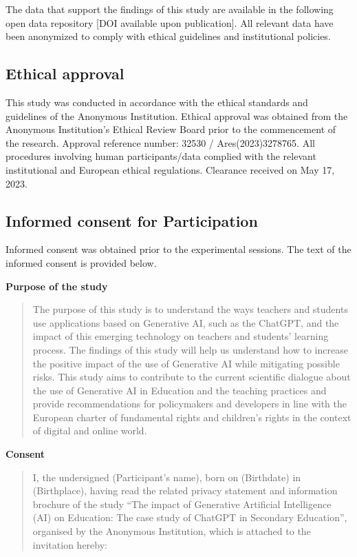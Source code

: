 \documentclass[
  12pt,
]{article}
\begin{document}
The data that support the findings of this study are available in the following open data repository {[}DOI available upon publication{]}. All relevant data have been anonymized to comply with ethical guidelines and institutional policies.

\subsection{Ethical approval}\label{ethical-approval}

This study was conducted in accordance with the ethical standards and guidelines of the Anonymous Institution. Ethical approval was obtained from the Anonymous Institution's Ethical Review Board prior to the commencement of the research. Approval reference number: 32530 / Ares(2023)3278765. All procedures involving human participants/data complied with the relevant institutional and European ethical regulations. Clearance received on May 17, 2023.

\subsection{Informed consent for Participation}\label{informed-consent-for-participation}

Informed consent was obtained prior to the experimental sessions. The text of the informed consent is provided below.

\textbf{Purpose of the study}

\begin{quote}
The purpose of this study is to understand the ways teachers and students use applications based on Generative AI, such as the ChatGPT, and the impact of this emerging technology on teachers and students' learning process. The findings of this study will help us understand how to increase the positive impact of the use of Generative AI while mitigating possible risks. This study aims to contribute to the current scientific dialogue about the use of Generative AI in Education and the teaching practices and provide recommendations for policymakers and developers in line with the European charter of fundamental rights and children's rights in the context of digital and online world.
\end{quote}

\textbf{Consent}

\begin{quote}
I, the undersigned (Participant's name), born on (Birthdate) in (Birthplace), having read the related privacy statement and information brochure of the study ``The impact of Generative Artificial Intelligence (AI) on Education: The case study of ChatGPT in Secondary Education'', organised by the Anonymous Institution, which is attached to the invitation hereby:
\end{quote}
\end{document}
